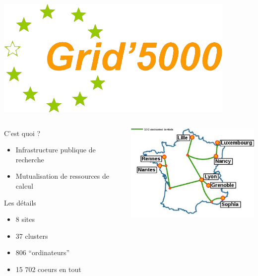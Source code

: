 \documentclass[10pt]{beamer}
\begin{document}

\begin{frame}[label=tme]
  \includegraphics{grid5000_logo.png}

  \begin{columns}
    \begin{column}{5cm}

      \begin{exampleblock}{C'est quoi ?}
        \begin{itemize}
        \item Infrastructure publique de recherche
        \item Mutualisation de ressources de calcul
        \end{itemize}
      \end{exampleblock}
      
      \begin{block}{Les détails}
        \begin{itemize}
        \item 8 sites
        \item 37 clusters
        \item 806 ``ordinateurs''
        \item 15 702 coeurs en tout
        \end{itemize}
      \end{block}

      
    \end{column}
    \begin{column}{7cm}
      \includegraphics[width=7cm]{grid5000.pdf}
    \end{column}
  \end{columns}
\end{frame}
\end{document}
